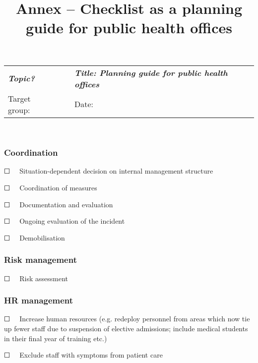 \documentclass{article}
\begin{document}
\title{Annex – Checklist as a planning guide for public health offices}

\maketitle





\begin{tabu} to \textwidth { |X|X|X| }
\hline



\emph{\textbf{Topic?}}  &  & \emph{\textbf{Title: Planning guide for public health offices}}
 \\


Target group:  &  & Date:
 \\
\hline

\end{tabu}

   


\subsubsection{Coordination}\label{H2442121}



☐   Situation-dependent decision on internal management structure


☐   Coordination of measures


☐   Documentation and evaluation


☐   Ongoing evaluation of the incident


☐   Demobilisation


\subsubsection{Risk management}\label{H3384617}



☐   Risk assessment 


\subsubsection{HR management}\label{H9541090}



☐   Increase human resources (e.g. redeploy personnel from areas which now tie up fewer staff due to suspension of elective admissions; include medical students in their final year of training etc.)


☐   Exclude staff with symptoms from patient care
\end{document}
